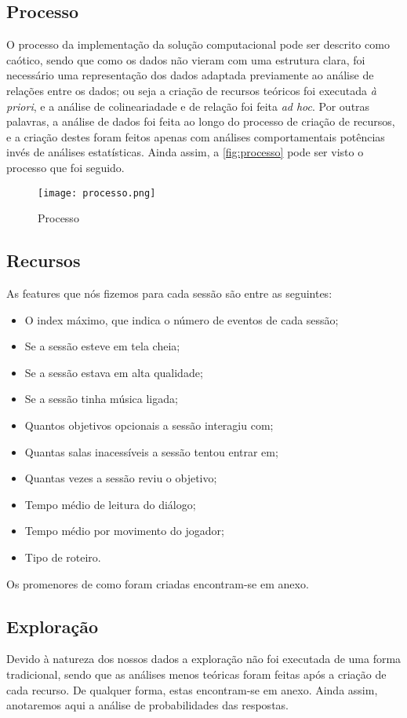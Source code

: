 \documentclass[justified, 11pt]{scrartcl}
\begin{document}
  \subsection{Processo}
  O processo da implementação da solução computacional pode ser descrito como caótico, sendo que como os dados não vieram com uma estrutura clara, foi necessário uma representação dos dados adaptada previamente ao análise de relações entre os dados; ou seja a criação de recursos teóricos foi executada \textit{à priori}, e a análise de colineariadade e de relação foi feita \textit{ad hoc}. Por outras palavras, a análise de dados foi feita ao longo do processo de criação de recursos, e a criação destes foram feitos apenas com análises comportamentais potências invés de análises estatísticas. Ainda assim, a \autoref{fig:processo} pode ser visto o processo que foi seguido.

  \begin{figure}[H]
    \centering
    \texttt{[image: processo.png]}
    \caption{Processo}
    \label{fig:processo}
  \end{figure}
  
  \subsection{Recursos}
  As features que nós fizemos para cada sessão são entre as seguintes:
  \begin{itemize}
    \item O index máximo, que indica o número de eventos de cada sessão;
    \item Se a sessão esteve em tela cheia;
    \item Se a sessão estava em alta qualidade;
    \item Se a sessão tinha música ligada;
    \item Quantos objetivos opcionais a sessão interagiu com;
    \item Quantas salas inacessíveis a sessão tentou entrar em;
    \item Quantas vezes a sessão reviu o objetivo;
    \item Tempo médio de leitura do diálogo;
    \item Tempo médio por movimento do jogador;
    \item Tipo de roteiro.
  \end{itemize}

  Os promenores de como foram criadas encontram-se em anexo.

  \subsection{Exploração}
  Devido à natureza dos nossos dados a exploração não foi executada de uma forma tradicional, sendo que as análises menos teóricas foram feitas após a criação de cada recurso. De qualquer forma, estas encontram-se em anexo. Ainda assim, anotaremos aqui a análise de probabilidades das respostas.
\end{document}
